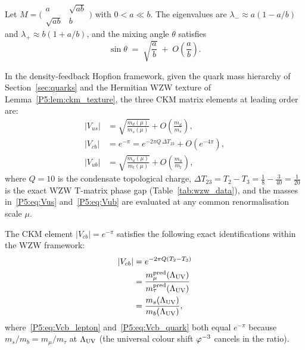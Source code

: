 \begin{lemma}
\label{P5:lem:ckm_2x2}
Let $M = \bigl(\begin{smallmatrix} a & \sqrt{ab} \\ \sqrt{ab} & b \end{smallmatrix}\bigr)$
with $0 < a \ll b$.
The eigenvalues are $\lambda_- \approx a(1-a/b)$ and $\lambda_+ \approx b(1+a/b)$,
and the mixing angle $\theta$ satisfies
\begin{equation}
  \sin\theta \;=\; \sqrt{\frac{a}{b}} \;+\; O\!\left(\frac{a}{b}\right).
  \label{P5:eq:2x2_mixing}
\end{equation}
\end{lemma}

\begin{theorem}
\label{P5:thm:ckm_full}
In the density-feedback Hopfion framework, given the quark mass hierarchy
of Section~\ref{sec:quarks} and the Hermitian WZW texture of
Lemma~\ref{P5:lem:ckm_texture}, the three CKM matrix elements at leading order are:
\begin{align}
  |V_{us}| &= \sqrt{\frac{m_d(\mu)}{m_s(\mu)}} + O\!\left(\frac{m_d}{m_s}\right),
  \label{P5:eq:Vus} \\[4pt]
  |V_{cb}| &= e^{-\pi} = e^{-2\pi Q\,\Delta T_{23}} + O\!\left(e^{-4\pi}\right),
  \label{P5:eq:Vcb} \\[4pt]
  |V_{ub}| &= \sqrt{\frac{m_u(\mu)}{m_t(\mu)}} + O\!\left(\frac{m_u}{m_t}\right),
  \label{P5:eq:Vub}
\end{align}
where $Q=10$ is the condensate topological charge,
$\Delta T_{23} = T_2 - T_3 = \tfrac{1}{8} - \tfrac{3}{40} = \tfrac{1}{20}$
is the exact WZW T-matrix phase gap (Table~\ref{tab:wzw_data}),
and the masses in~\eqref{P5:eq:Vus} and~\eqref{P5:eq:Vub} are evaluated at any
common renormalisation scale $\mu$.
\end{theorem}

\begin{theorem}
\label{P5:thm:vcb_wzw}
The CKM element $|V_{cb}| = e^{-\pi}$ satisfies the following exact
identifications within the WZW framework:
\begin{align}
  |V_{cb}|
  &= e^{-2\pi Q(T_2-T_3)} \label{P5:eq:Vcb_overlap} \\
  &= \frac{m_\mu^{\mathrm{pred}}(\Lambda_{\mathrm{UV}})}{m_\tau^{\mathrm{pred}}(\Lambda_{\mathrm{UV}})} \label{P5:eq:Vcb_lepton} \\
  &= \frac{m_s(\Lambda_{\mathrm{UV}})}{m_b(\Lambda_{\mathrm{UV}})}, \label{P5:eq:Vcb_quark}
\end{align}
where~\eqref{P5:eq:Vcb_lepton} and~\eqref{P5:eq:Vcb_quark} both equal
$e^{-\pi}$ because $m_s/m_b = m_\mu/m_\tau$ at $\Lambda_{\mathrm{UV}}$
(the universal colour shift $\varphi^{-3}$ cancels in the ratio).
\end{theorem}

